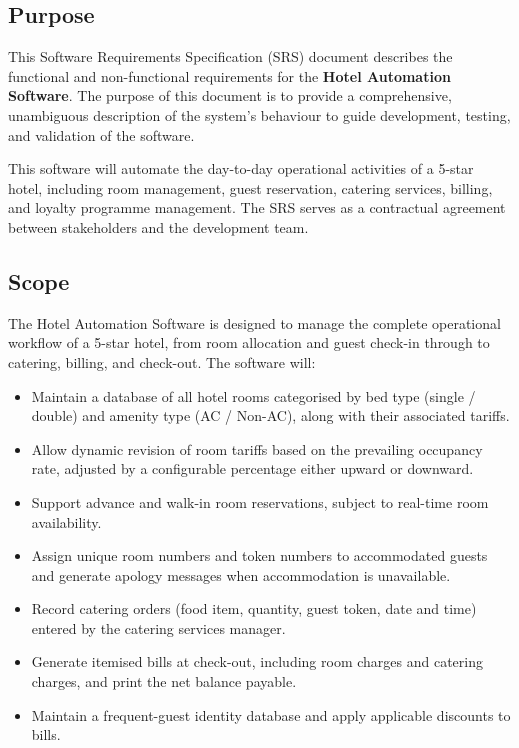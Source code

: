 \documentclass[12pt,a4paper]{article}
\begin{document}
\subsection{Purpose}

This Software Requirements Specification (SRS) document describes the functional and
non-functional requirements for the \textbf{Hotel Automation Software}. The purpose of
this document is to provide a comprehensive, unambiguous description of the system's
behaviour to guide development, testing, and validation of the software.

This software will automate the day-to-day operational activities of a 5-star hotel,
including room management, guest reservation, catering services, billing, and loyalty
programme management. The SRS serves as a contractual agreement between stakeholders and
the development team.

\subsection{Scope}

The Hotel Automation Software is designed to manage the complete operational workflow of a
5-star hotel, from room allocation and guest check-in through to catering, billing, and
check-out. The software will:

\begin{itemize}[leftmargin=1.5em]
  \item Maintain a database of all hotel rooms categorised by bed type (single / double)
        and amenity type (AC / Non-AC), along with their associated tariffs.
  \item Allow dynamic revision of room tariffs based on the prevailing occupancy rate,
        adjusted by a configurable percentage either upward or downward.
  \item Support advance and walk-in room reservations, subject to real-time room availability.
  \item Assign unique room numbers and token numbers to accommodated guests and generate
        apology messages when accommodation is unavailable.
  \item Record catering orders (food item, quantity, guest token, date and time) entered
        by the catering services manager.
  \item Generate itemised bills at check-out, including room charges and catering charges,
        and print the net balance payable.
  \item Maintain a frequent-guest identity database and apply applicable discounts to bills.
\end{itemize}
\end{document}
